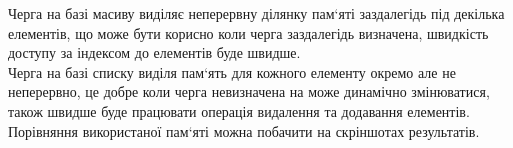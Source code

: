 Черга на базі масиву виділяє неперервну ділянку пам`яті заздалегідь під декілька елементів, що може 
бути корисно коли черга заздалегідь визначена, швидкість доступу за індексом до елементів буде швидше.\\

  Черга на базі списку виділя пам`ять для кожного елементу окремо але не неперервно, це добре коли 
черга невизначена на може динамічно змінюватися, також швидше буде працювати операція видалення та додавання елементів.\\

Порівняння використаної пам`яті можна побачити на скріншотах результатів.



